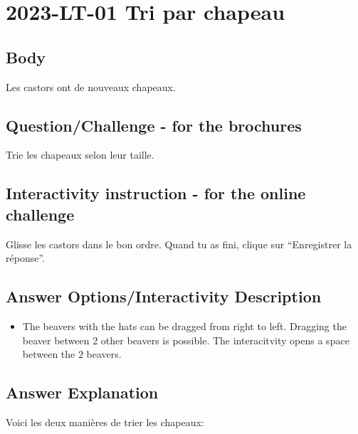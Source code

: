 \documentclass[a4paper,11pt]{report}
\newcommand{\taskGraphicsFolder}{..}
\begin{document}
\section*{\centering{} 2023-LT-01 Tri par chapeau}


\subsection*{Body}

Les castors ont de nouveaux chapeaux.

{\centering%
\par}

{\em


\subsection*{Question/Challenge - for the brochures}

Trie les chapeaux selon leur taille.

}


\subsection*{Interactivity instruction - for the online challenge}

Glisse les castors dans le bon ordre. Quand tu as fini, clique sur “Enregistrer la réponse”.

\begingroup
\renewcommand{\arraystretch}{1.5}
\subsection*{Answer Options/Interactivity Description}

\begin{itemize}
  \item The beavers with the hats can be dragged from right to left. Dragging the beaver between $2$ other beavers is possible. The interacitvity opens a space between the $2$ beavers.
\end{itemize}

\endgroup

\subsection*{Answer Explanation}

Voici les deux manières de trier les chapeaux:
\end{document}
